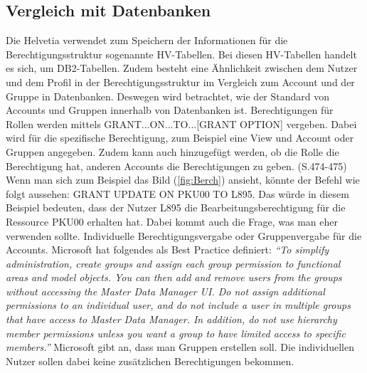 \subsection{Vergleich mit Datenbanken}
\label{sec:chapter04:DB}
Die Helvetia verwendet zum Speichern der Informationen für die Berechtigungsstruktur sogenannte HV-Tabellen.
Bei diesen HV-Tabellen handelt es sich, um DB2-Tabellen.
Zudem besteht eine Ähnlichkeit zwischen dem Nutzer und dem Profil in der Berechtigungsstruktur im Vergleich zum Account und der Gruppe in Datenbanken.
Deswegen wird betrachtet, wie der Standard von Accounts und Gruppen innerhalb von Datenbanken ist.
\newline
Berechtigungen für Rollen werden mittels GRANT...ON...TO...[GRANT OPTION] vergeben.
Dabei wird für die spezifische Berechtigung, zum Beispiel eine View und Account oder Gruppen angegeben.
Zudem kann auch hinzugefügt werden, ob die Rolle die Berechtigung hat, anderen Accounts die Berechtigungen zu geben.\cite{Ram09} (S.474-475)
\newline
Wenn man sich zum Beispiel das Bild (\ref{fig:Berch}) ansieht, könnte der Befehl wie folgt aussehen:
\newline
\newline
GRANT UPDATE ON PKU00 TO L895.
\newline
\newline
Das würde in diesem Beispiel bedeuten, dass der Nutzer L895 die Bearbeitungsberechtigung für die Ressource PKU00 erhalten hat.
Dabei kommt auch die Frage, was man eher verwenden sollte.
Individuelle Berechtigungsvergabe oder Gruppenvergabe für die Accounts.
Microsoft hat folgendes als Best Practice definiert:
\newline
\newline
\textit{"`To simplify administration, create groups and assign each group permission to functional areas and model objects.
You can then add and remove users from the groups without accessing the Master Data Manager UI.
\newline
\newline
Do not assign additional permissions to an individual user, and do not include a user in multiple groups that have access to Master Data Manager. In addition, do not use hierarchy member permissions unless you want a group to have limited access to specific members."'} \cite{Micro}
\newline
\newline
Microsoft gibt an, dass man Gruppen erstellen soll.
Die individuellen Nutzer sollen dabei keine zusätzlichen Berechtigungen bekommen.
